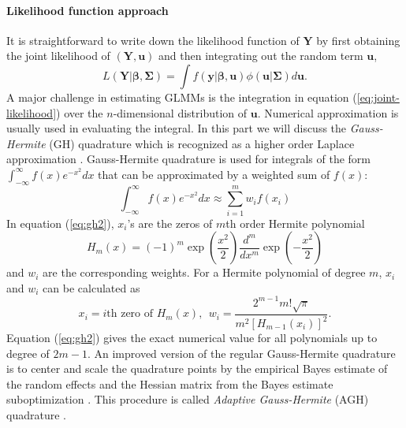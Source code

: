 \paragraph{Likelihood function approach}\label{para:likelihood-approach}
It is straightforward  to write down the likelihood function of $\bm Y$ by first obtaining the
joint likelihood of $(\bm Y, \bm u)$ and then integrating out the random term $\bm u$,
\begin{equation}\label{eq:joint-likelihood}
	L(\bm Y|\bm\beta, \bm \Sigma) = \int f(\bm y|\bm \beta, \bm u)\phi(\bm u|\bm \Sigma)d \bm u.
\end{equation}
A major challenge in estimating GLMMs is the integration in equation (\ref{eq:joint-likelihood})
over the $n$-dimensional distribution of $\bm u$. Numerical approximation is usually used in
evaluating the integral. In this part we will discuss the \textit{Gauss-Hermite} (GH) quadrature
which is recognized as a higher order Laplace approximation \citep{liu1994note}.
Gauss-Hermite quadrature is used for integrals of the form 
$\int_{-\infty}^{\infty}f(x) e^{-x^2}dx$ that can be approximated by a weighted sum of  $f(x)$:
\begin{equation}\label{eq:gh2}
	\int_{-\infty}^{\infty}f(x) e^{-x^2}dx \approx \sum_{i=1}^m w_if(x_i)
\end{equation}
In equation (\ref{eq:gh2}), $x_i$'s are the zeros of $m$th order Hermite polynomial 
\[H_m(x) = (-1)^m\exp(\dfrac{x^2}{2})\frac{d^m}{dx^m}\exp(-\dfrac{x^2}{2})\]
and $w_i$ are the corresponding weights. For a Hermite polynomial of degree $m$, $x_i$ and $w_i$
can be calculated as 	
\begin{equation}\label{eq:gh3}
	x_i = i\text{th zero of } H_m(x),~~  w_i = \frac{2^{m-1}m!\sqrt{\pi}}{m^2[H_{m-1}(x_i)]^2}. 
\end{equation}
Equation (\ref{eq:gh2}) gives the exact numerical value for all polynomials up to degree of
$2m-1$. 
An improved version of the regular Gauss-Hermite quadrature is to center and scale the quadrature
points  by the empirical Bayes estimate of the random effects and the Hessian matrix from the Bayes
estimate suboptimization \citep{liu1994note}. This procedure is called \textit{Adaptive
	Gauss-Hermite} (AGH) quadrature \citep{pinheiro1995approximations}. %

